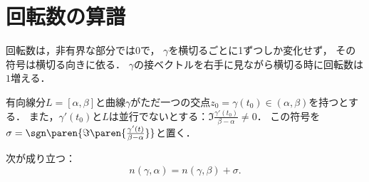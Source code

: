 \documentclass[uplatex, dvipdfmx]{jsreport}
\begin{document}
\section{回転数の算譜}

\begin{screen}
    回転数は，非有界な部分では$0$で，
    $\gamma$を横切るごとに1ずつしか変化せず，
    その符号は横切る向きに依る．
    $\gamma$の接ベクトルを右手に見ながら横切る時に回転数は$1$増える．
\end{screen}

\begin{notation}
    有向線分$L=[\alpha,\beta]$と曲線$\gamma$がただ一つの交点$z_0=\gamma(t_0)\in(\alpha,\beta)$を持つとする．
    また，$\gamma'(t_0)$と$L$は並行でないとする：$\Im\frac{\gamma'(t_0)}{\beta-\alpha}\ne 0$．
    この符号を$\sigma=\sgn\paren{\Im\paren{\frac{\gamma'(t)}{\beta-\alpha}}}$と置く．
\end{notation}
\clearpage
\begin{proposition}
    次が成り立つ：
    \[n(\gamma,\alpha)=n(\gamma,\beta)+\sigma.\]
\end{proposition}
\end{document}
